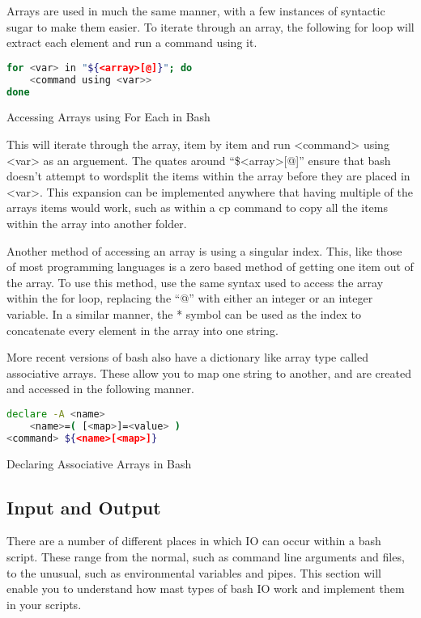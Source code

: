 			Arrays are used in much the same manner, with a few instances of syntactic sugar to make them easier. 
			To iterate through an array, the following for loop will extract each element and run a command using it. 
			\begin{code}
			\begin{lstlisting}[language=bash]
for <var> in "${<array>[@]}"; do
	<command using <var>>
done
			\end{lstlisting} 
			\label{code:ForEachArrayAccess}
			\caption{Accessing Arrays using For Each in Bash}
			\end{code}
			This will iterate through the array, item by item and run <command> using <var> as an arguement. 
			The quates around ``\$<array>[@]'' ensure that bash doesn't attempt to wordsplit the items within the array before they are placed in <var>.
			This expansion can be implemented anywhere that having multiple of the arrays items would work, such as within a cp command to copy all the items within the array into another folder. 

			Another method of accessing an array is using a singular index. 
			This, like those of most programming languages is a zero based method of getting one item out of the array. 
			To use this method, use the same syntax used to access the array within the for loop, replacing the ``@'' with either an integer or an integer variable. 
			In a similar manner, the \** symbol can be used as the index to concatenate every element in the array into one string. 

			More recent versions of bash also have a dictionary like array type called associative arrays. 
			These allow you to map one string to another, and are created and accessed in the following manner. 
			\begin{code}
			\begin{lstlisting}[language=bash]
declare -A <name>
	<name>=( [<map>]=<value> )
<command> ${<name>[<map>]}
			\end{lstlisting}
			\label{code:DeclareAssociativeArrayBash}
			\caption{Declaring Associative Arrays in Bash}
			\end{code}

		\subsection{Input and Output}
			There are a number of different places in which IO can occur within a bash script. 
			These range from the normal, such as command line arguments and files, to the unusual, such as environmental variables and pipes. 
			This section will enable you to understand how mast types of bash IO work and implement them in your scripts. 

